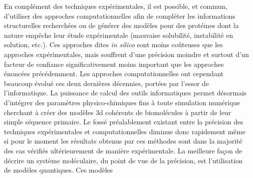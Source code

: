En complément des techniques expérimentales, il est possible, et commun, d'utiliser des approches computationnelles afin de compléter les informations structurelles recherchées ou de générer des modèles pour des protéines dont la nature empêche leur étude expérimentale (mauvaise solubilité, instabilité en solution, etc.). Ces approches dites \textit{in silico} sont moins coûteuses que les approches expérimentales, mais souffrent d'une précision moindre et surtout d'un facteur de confiance significativement moins important que les approches énoncées précédemment. Les approches computationnelles ont cependant beaucoup évolué ces deux dernières décennies, portées par l'essor de l'informatique. La puissance de calcul des outils informatiques permet désormais d'intégrer des paramètres physico-chimiques fins à toute simulation numérique cherchant à créer des modèles 3d cohérents de biomolécules à partir de leur simple séquence primaire. Le fossé préalablement existant entre la précision des techniques expérimentales et computationnelles diminue donc rapidement même si pour le moment les résultats obtenus par ces méthodes sont dans la majorité des cas vérifiés ultérieurement de manière expérimentale. La meilleure façon de décrire un système moléculaire, du point de vue de la précision, est l'utilisation de modèles quantiques. Ces modèles 

